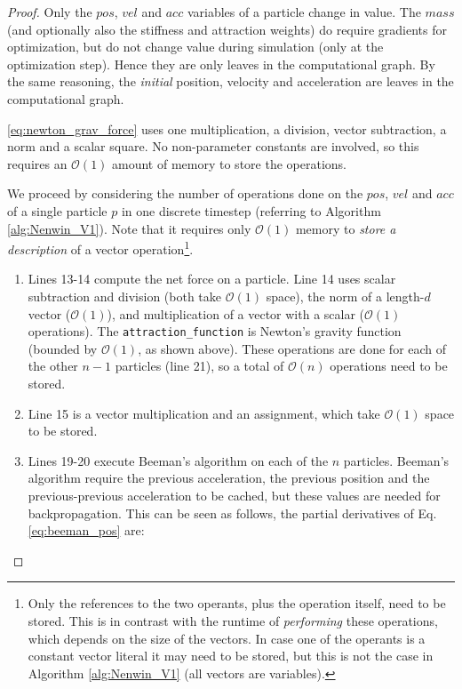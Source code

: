 \begin{proof}
Only the $pos$, $vel$ and $acc$ variables of a particle change in value. The $mass$ (and optionally also the stiffness and attraction weights) do require gradients for optimization, but do not change value during simulation (only at the optimization step). Hence they are only leaves in the computational graph. By the same reasoning, the \textit{initial} position, velocity and acceleration are leaves in the computational graph.

\eqref{eq:newton_grav_force} uses one multiplication, a division, vector subtraction, a norm and a scalar square. No non-parameter constants are involved, so this requires an $\mathcal{O}(1)$ amount of memory to store the operations.

We proceed by considering the number of operations done on the $pos$, $vel$ and $acc$ of a single particle $p$ in one discrete timestep (referring to Algorithm \ref{alg:Nenwin_V1}). Note that it requires only $\mathcal{O}(1)$ memory to \textit{store a description} of a vector operation\footnote{Only the references to the two operants, plus the operation itself, need to be stored. This is in contrast with the runtime of \textit{performing} these operations, which depends on the size of the vectors. In case one of the operants is a constant vector literal it may need to be stored, but this is not the case in Algorithm \ref{alg:Nenwin_V1} (all vectors are variables).}.
\begin{enumerate}
    \item Lines 13-14 compute the net force on a particle. Line 14 uses scalar subtraction and division (both take $\mathcal{O}(1)$ space), the norm of a length-$d$ vector ($\mathcal{O}(1)$), and multiplication of a vector with a scalar ($\mathcal{O}(1)$ operations). The \texttt{attraction\_function} is Newton's gravity function (bounded by $\mathcal{O}(1)$, as shown above). These operations are done for each of the other $n-1$ particles (line 21), so a total of $\mathcal{O}(n)$ operations need to be stored. 
    \item Line 15 is a vector multiplication and an assignment, which take $\mathcal{O}(1)$ space to be stored.
    \item Lines 19-20 execute Beeman's algorithm on each of the $n$ particles. Beeman's algorithm require the previous acceleration, the previous position and the previous-previous acceleration to be cached, but these values are needed for backpropagation. This can be seen as follows, the partial derivatives of Eq. \eqref{eq:beeman_pos} are:

\end{enumerate}
\end{proof}
